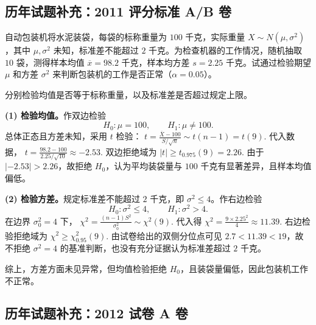\documentclass[lang=cn,11pt]{elegantbook}
\begin{document}
\subsection*{历年试题补充：2011 评分标准 A/B 卷}

\begin{exercise}\label{exer:src-2011-ab-a-07-34credit}
自动包装机将水泥装袋，每袋的标称重量为 \(100\) 千克，实际重量 \(X\sim N(\mu,\sigma^2)\)，其中 \(\mu,\sigma^2\) 未知，标准差不能超过 \(2\) 千克。为检查机器的工作情况，随机抽取 \(10\) 袋，测得样本均值 \(\overline x=98.2\) 千克，样本均方差 \(s=2.25\) 千克。试通过检验期望 \(\mu\) 和方差 \(\sigma^2\) 来判断包装机的工作是否正常（\(\alpha=0.05\)）。
\end{exercise}
\begin{solution}
分别检验均值是否等于标称重量，以及标准差是否超过规定上限。

\textbf{(1) 检验均值。}作双边检验
\[
H_0\colon \mu=100,\qquad H_1\colon \mu\ne100.
\]
总体正态且方差未知，采用 \(t\) 检验：
\(
t=\frac{\overline X-100}{S/\sqrt n}\sim t(n-1)=t(9).
\)
代入数据，
\(
t=\frac{98.2-100}{2.25/\sqrt{10}}\approx -2.53.
\)
双边拒绝域为
\(
|t|\ge t_{0.975}(9)=2.26.
\)
由于 \(|-2.53|>2.26\)，故拒绝 \(H_0\)，认为平均装袋量与 \(100\) 千克有显著差异，且样本均值偏低。

\textbf{(2) 检验方差。}规定标准差不能超过 \(2\) 千克，即 \(\sigma^2\le4\)。作右边检验
\[
H_0\colon \sigma^2\le4,\qquad H_1\colon \sigma^2>4.
\]
在边界 \(\sigma_0^2=4\) 下，
\(
\chi^2=\frac{(n-1)S^2}{\sigma_0^2}\sim\chi^2(9).
\)
代入得
\(
\chi^2=\frac{9\times2.25^2}{4}\approx11.39.
\)
右边检验拒绝域为
\(
\chi^2\ge \chi^2_{0.95}(9).
\)
由试卷给出的双侧分位点可见 \(2.7<11.39<19\)，故不拒绝 \(\sigma^2=4\) 的基准判断，也没有充分证据认为标准差超过 \(2\) 千克。

综上，方差方面未见异常，但均值检验拒绝 \(H_0\)，且装袋量偏低，因此包装机工作不正常。
\end{solution}

\subsection*{历年试题补充：2012 试卷 A 卷}
\end{document}
